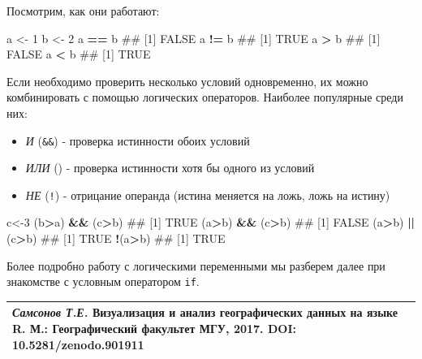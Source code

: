 \documentclass[]{book}
\newenvironment{Shaded}{\begin{snugshade}}{\end{snugshade}}
\newcommand{\DecValTok}[1]{\textcolor[rgb]{0.00,0.00,0.81}{#1}}
\newcommand{\StringTok}[1]{\textcolor[rgb]{0.31,0.60,0.02}{#1}}
\newcommand{\OperatorTok}[1]{\textcolor[rgb]{0.81,0.36,0.00}{\textbf{#1}}}
\newcommand{\NormalTok}[1]{#1}
\providecommand{\tightlist}{%
  \setlength{\itemsep}{0pt}\setlength{\parskip}{0pt}}
\begin{document}
Посмотрим, как они работают:

\begin{Shaded}
\begin{Highlighting}[]
\NormalTok{a <-}\StringTok{ }\DecValTok{1}
\NormalTok{b <-}\StringTok{ }\DecValTok{2}
\NormalTok{a }\OperatorTok{==}\StringTok{ }\NormalTok{b}
\NormalTok{## [1] FALSE}
\NormalTok{a }\OperatorTok{!=}\StringTok{ }\NormalTok{b}
\NormalTok{## [1] TRUE}
\NormalTok{a }\OperatorTok{>}\StringTok{ }\NormalTok{b}
\NormalTok{## [1] FALSE}
\NormalTok{a }\OperatorTok{<}\StringTok{ }\NormalTok{b}
\NormalTok{## [1] TRUE}
\end{Highlighting}
\end{Shaded}

Если необходимо проверить несколько условий одновременно, их можно
комбинировать с помощью логических операторов. Наиболее популярные среди
них:

\begin{itemize}
\tightlist
\item
  \emph{И} (\texttt{\&\&}) - проверка истинности обоих условий
\item
  \emph{ИЛИ} (\texttt{\textbar{}\textbar{}}) - проверка истинности хотя
  бы одного из условий
\item
  \emph{НЕ} (\texttt{!}) - отрицание операнда (истина меняется на ложь,
  ложь на истину)
\end{itemize}

\begin{Shaded}
\begin{Highlighting}[]
\NormalTok{c<-}\DecValTok{3}
\NormalTok{(b}\OperatorTok{>}\NormalTok{a) }\OperatorTok{&&}\StringTok{ }\NormalTok{(c}\OperatorTok{>}\NormalTok{b)}
\NormalTok{## [1] TRUE}
\NormalTok{(a}\OperatorTok{>}\NormalTok{b) }\OperatorTok{&&}\StringTok{ }\NormalTok{(c}\OperatorTok{>}\NormalTok{b)}
\NormalTok{## [1] FALSE}
\NormalTok{(a}\OperatorTok{>}\NormalTok{b) }\OperatorTok{||}\StringTok{ }\NormalTok{(c}\OperatorTok{>}\NormalTok{b)}
\NormalTok{## [1] TRUE}
\OperatorTok{!}\NormalTok{(a}\OperatorTok{>}\NormalTok{b)}
\NormalTok{## [1] TRUE}
\end{Highlighting}
\end{Shaded}

Более подробно работу с логическими переменными мы разберем далее при
знакомстве с условным оператором \texttt{if}.

\begin{longtable}[]{@{}l@{}}
\toprule
\emph{Самсонов Т.Е.} \textbf{Визуализация и анализ географических данных
на языке R.} М.: Географический факультет МГУ, 2017. DOI:
10.5281/zenodo.901911\tabularnewline
\bottomrule
\end{longtable}
\end{document}
